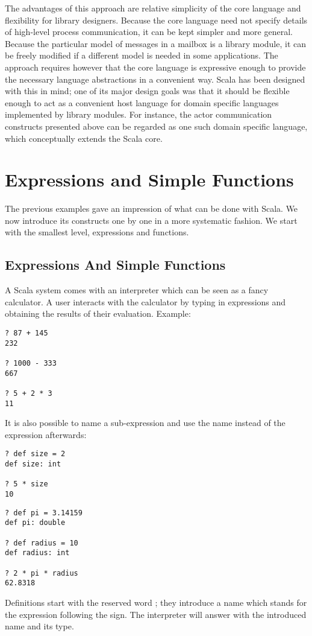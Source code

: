 \documentclass[a4paper,12pt,twoside,titlepage]{book}
\begin{document}
The advantages of this approach are relative simplicity of the core
language and flexibility for library designers. Because the core
language need not specify details of high-level process communication,
it can be kept simpler and more general. Because the particular model
of messages in a mailbox is a library module, it can be freely
modified if a different model is needed in some applications.  The
approach requires however that the core language is expressive enough
to provide the necessary language abstractions in a convenient
way. Scala has been designed with this in mind; one of its major
design goals was that it should be flexible enough to act as a
convenient host language for domain specific languages implemented by
library modules. For instance, the actor communication constructs
presented above can be regarded as one such domain specific language,
which conceptually extends the Scala core.

\chapter{\label{chap:simple-funs}Expressions and Simple Functions}

The previous examples gave an impression of what can be done with
Scala.  We now introduce its constructs one by one in a more
systematic fashion. We start with the smallest level, expressions and
functions.

\section{Expressions And Simple Functions}

A Scala system comes with an interpreter which can be seen as a
fancy calculator. A user interacts with the calculator by typing in
expressions and obtaining the results of their evaluation. Example:

\begin{lstlisting}
? 87 + 145
232

? 1000 - 333
667

? 5 + 2 * 3
11
\end{lstlisting}
It is also possible to name a sub-expression and use the name instead
of the expression afterwards:
\begin{lstlisting}
? def size = 2
def size: int

? 5 * size
10
\end{lstlisting}
\begin{lstlisting}
? def pi = 3.14159
def pi: double

? def radius = 10
def radius: int

? 2 * pi * radius
62.8318
\end{lstlisting}
Definitions start with the reserved word ; they introduce a
name which stands for the expression following the \code{=} sign.  The
interpreter will answer with the introduced name and its type.
\end{document}

